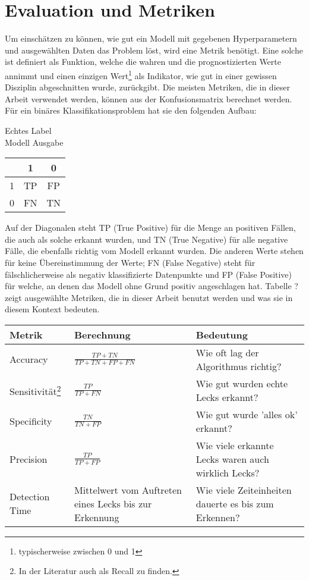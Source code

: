 \section{Evaluation und Metriken}

Um einschätzen zu können, wie gut ein Modell mit gegebenen Hyperparametern und ausgewählten Daten das Problem
 löst, wird eine Metrik benötigt. Eine solche ist definiert als Funktion, welche die wahren und die
 prognostizierten Werte annimmt und einen einzigen Wert\footnote{typischerweise zwischen 0 und 1} als
 Indikator, wie gut in einer gewissen Disziplin abgeschnitten wurde, zurückgibt. Die meisten Metriken,
 die in dieser Arbeit verwendet werden, können aus der Konfusionsmatrix berechnet werden. Für ein binäres
 Klassifikationsproblem hat sie den folgenden Aufbau:

\begin{center}
    \hspace{3.1cm}Echtes Label \\ Modell Ausgabe
    \begin{tabular}{ c | c c | }
      & 1 & 0 \\ 
     \hline
     1 & TP & FP \\  
     0 & FN & TN \\
     \hline  
    \end{tabular}
\end{center}

Auf der Diagonalen steht TP (True Positive) für die Menge an positiven Fällen, die auch als solche erkannt
 wurden, und TN (True Negative) für alle negative Fälle, die ebenfalls richtig vom Modell erkannt wurden.
 Die anderen Werte stehen für keine Übereinstimmung der Werte; FN (False Negative) steht für fälschlicherweise
 als negativ klassifizierte Datenpunkte und FP (False Positive) für welche, an denen das Modell ohne Grund
 positiv angeschlagen hat. Tabelle ? zeigt ausgewählte Metriken, die in dieser Arbeit benutzt werden und was sie
 in diesem Kontext bedeuten.

 \renewcommand{\arraystretch}{2}
\begin{tabular}{ m{6em} m{7em} m{16em} }
    Metrik & Berechnung & Bedeutung \\
    \hline
    Accuracy              & $\frac{TP+TN}{TP+TN+FP+FN}$ & Wie oft lag der Algorithmus richtig? \\
    Sensitivität\footnote{In der Literatur auch als Recall zu finden.} & $\frac{TP}{TP+FN}$          & Wie gut wurden echte Lecks erkannt? \\
    Specificity           & $\frac{TN}{TN+FP}$          & Wie gut wurde 'alles ok' erkannt? \\
    Precision             & $\frac{TP}{TP+FP}$          & Wie viele erkannte Lecks waren auch wirklich Lecks? \\
    Detection Time        & Mittelwert vom Auftreten eines Lecks bis zur Erkennung & Wie viele Zeiteinheiten dauerte es bis zum Erkennen?
\end{tabular}

